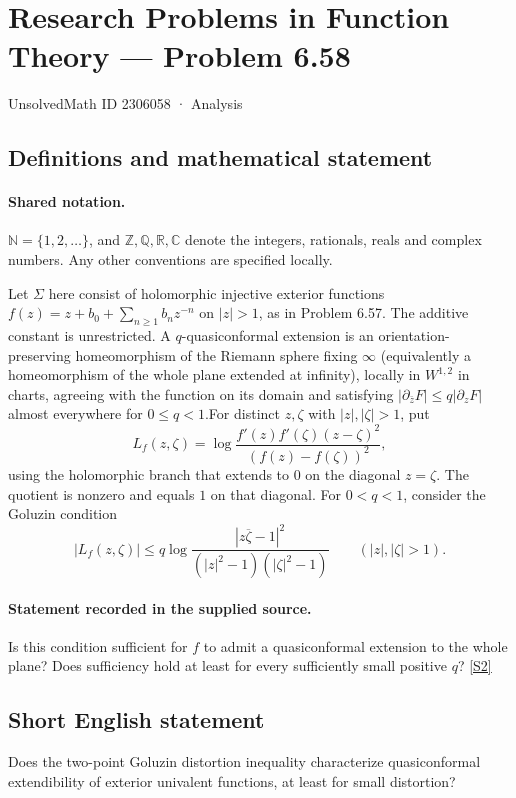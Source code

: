 \documentclass[11pt]{article}
\newcommand{\sref}[2]{\hyperlink{source:#1:#2}{[S#2]}}
\begin{document}
\setcounter{section}{2306057}
\section{Research Problems in Function Theory — Problem 6.58}\label{2306058}
{\small\sffamily UnsolvedMath ID 2306058 · Analysis}
\subsection{Definitions and mathematical statement}

\paragraph{Shared notation.}$\mathbb N=\{1,2,\ldots\}$, and $\mathbb Z,\mathbb Q,\mathbb R,\mathbb C$ denote the integers, rationals, reals and complex numbers. Any other conventions are specified locally.


Let $\Sigma$ here consist of holomorphic injective exterior functions $f(z)=z+b_0+\sum_{n\ge1}b_nz^{-n}$ on $|z|>1$, as in Problem 6.57. The additive constant is unrestricted. A $q$-quasiconformal extension is an orientation-preserving homeomorphism of the Riemann sphere fixing $\infty$ (equivalently a homeomorphism of the whole plane extended at infinity), locally in $W^{1,2}$ in charts, agreeing with the function on its domain and satisfying $|\partial_{\bar z}F|\le q|\partial_zF|$ almost everywhere for $0\le q<1$.For distinct $z,\zeta$ with $|z|,|\zeta|>1$, put
\[L_f(z,\zeta)=\log\frac{f'(z)f'(\zeta)(z-\zeta)^2}{(f(z)-f(\zeta))^2},\]
using the holomorphic branch that extends to $0$ on the diagonal $z=\zeta$. The quotient is nonzero and equals $1$ on that diagonal. For $0<q<1$, consider the Goluzin condition
\[|L_f(z,\zeta)|\le q\log\frac{|z\overline\zeta-1|^2}{(|z|^2-1)(|\zeta|^2-1)}\qquad(|z|,|\zeta|>1).\]
\paragraph{Statement recorded in the supplied source.}
Is this condition sufficient for $f$ to admit a quasiconformal extension to the whole plane? Does sufficiency hold at least for every sufficiently small positive $q$? \sref{2306058}{2}
\subsection{Short English statement}
Does the two-point Goluzin distortion inequality characterize quasiconformal extendibility of exterior univalent functions, at least for small distortion?
\end{document}
